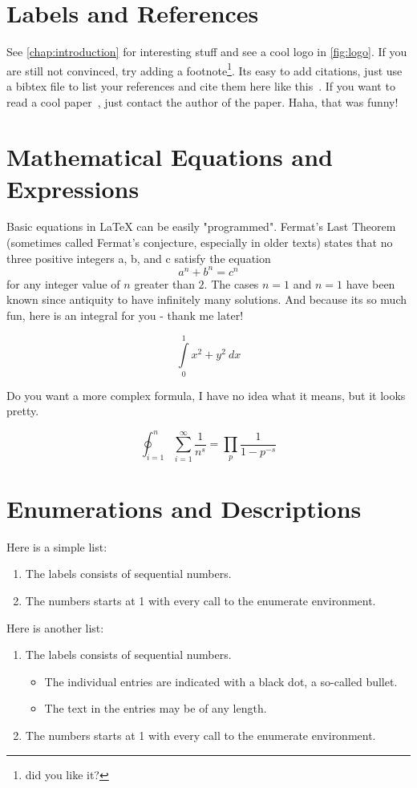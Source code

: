\documentclass{imc-inf}
\begin{document}
\section{Labels and References}
See \autoref{chap:introduction} for interesting stuff and see a cool logo in \autoref{fig:logo}. If you are still not convinced, try adding a footnote\footnote{did you like it?}. Its easy to add citations, just use a bibtex file to list your references and cite them here like this~\cite{988366}. If you want to read a cool paper~\cite{DBLP:conf/euromicro/DhunganaHW20}, just contact the author of the paper. Haha, that was funny! 


\section{Mathematical Equations and Expressions}
Basic equations in  \LaTeX{} can be easily "programmed". Fermat's Last Theorem (sometimes called Fermat's conjecture, especially in older texts) states that no three positive integers a, b, and c satisfy the equation \[ a^n + b^n = c^n \] for any integer value of $n$ greater than $2$. The cases $n = 1$ and  $n = 1$  have been known since antiquity to have infinitely many solutions. And because its so much fun, here is an integral for you - thank me later!  

\[ \int\limits_0^1 x^2 + y^2 \ dx \]

Do you want a more complex formula, I have no idea what it means, but it looks pretty. 

\[\oint_{i=1}^n \sum_{i=1}^{\infty} \frac{1}{n^s} 
= \prod_p \frac{1}{1 - p^{-s}} \]


\section{Enumerations and Descriptions}
Here is a simple list: 
\begin{enumerate}
	\item The labels consists of sequential numbers.
	\item The numbers starts at 1 with every call to the enumerate environment.
\end{enumerate}

Here is another list: 

\begin{enumerate}
	\item The labels consists of sequential numbers.
	\begin{itemize}
		\item The individual entries are indicated with a black dot, a so-called bullet.
		\item The text in the entries may be of any length.
	\end{itemize}
	\item The numbers starts at 1 with every call to the enumerate environment.
\end{enumerate}
\end{document}
